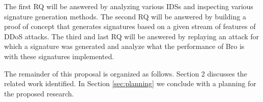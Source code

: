 The first RQ will be answered by analyzing various IDSs and inspecting various signature generation methods. The second RQ will be answered by building a proof of concept that generates signatures based on a given stream of features of DDoS attacks. The third and last RQ will be answered by replaying an attack for which a signature was generated and analyze what the performance of Bro is with these signatures implemented. 










 
The remainder of this proposal is organized as follows. Section 2 discusses the related work identified. In Section \ref{sec:planning} we conclude with a planning for the proposed research. 



